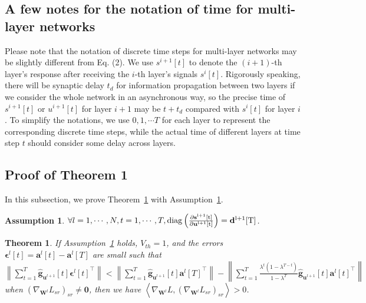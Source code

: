 \documentclass{article}
\begin{document}
\subsection{A few notes for the notation of time for multi-layer networks}

Please note that the notation of discrete time steps for multi-layer networks may be slightly different from Eq. (2). We use $s^{i+1}[t]$ to denote the $(i+1)$-th layer’s response after receiving the $i$-th layer’s signals $s^i[t]$. Rigorously speaking, there will be synaptic delay $t_d$ for information propagation between two layers if we consider the whole network in an asynchronous way, so the precise time of $s^{i+1}[t]$ or $u^{i+1}[t]$ for layer $i+1$ may be $t+t_d$ compared with $s^i[t]$ for layer $i$. To simplify the notations, we use $0, 1, \cdots T$ for each layer to represent the corresponding discrete time steps, while the actual time of different layers at time step $t$ should consider some delay across layers.


\subsection{Proof of Theorem 1}

In this subsection, we prove Theorem~\ref{supthm_feedforward} with Assumption~\ref{supassumption1}.

\newtheorem{supassumption}{\bf Assumption}
\begin{supassumption}\label{supassumption1}
$\forall l=1,\cdots,N, t=1,\cdots,T, \rm{diag}\left(\frac{\partial \mathbf{s}^{l+1}[t]}{\partial \mathbf{u}^{l+1}[t]}\right) = \mathbf{d}^{l+1}[T]$.
\end{supassumption}

\newtheorem{supthm}{\bf Theorem}
\begin{supthm}\label{supthm_feedforward}
If Assumption~\ref{supassumption1} holds, $V_{th}=1$, and the errors $\bm{\epsilon}^l[t]=\mathbf{a}^l[t]-\mathbf{a}^l[T]$ are small such that $\left\lVert \sum_{t=1}^T \hat{\mathbf{g}}_{\mathbf{u}^{l+1}}[t] {\bm{\epsilon}^l[t]}^\top \right\rVert < \left\lVert \sum_{t=1}^T \hat{\mathbf{g}}_{\mathbf{u}^{l+1}}[t] {\mathbf{a}^l[T]}^\top \right\rVert - \left\lVert \sum_{t=1}^T \frac{\lambda^t(1-\lambda^{T-t})}{1-\lambda^T}\hat{\mathbf{g}}_{\mathbf{u}^{l+1}}[t] {\mathbf{a}^l[t]}^\top \right\rVert$ when $\left(\nabla_{\mathbf{W}^l}L_{sr}\right)_{sr}\neq\mathbf{0}$, then we have $\left<\nabla_{\mathbf{W}^l}L, \left(\nabla_{\mathbf{W}^l}L_{sr}\right)_{sr}\right> > 0$.
\end{supthm}
\end{document}
